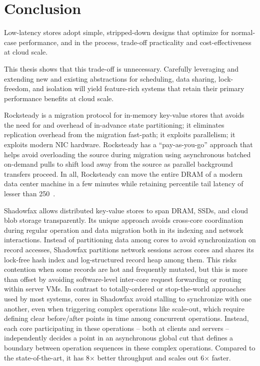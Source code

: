 \chapter{Conclusion}

Low-latency stores adopt simple, stripped-down designs that optimize
for normal-case performance, and in the process, trade-off
practicality and cost-effectiveness at cloud scale.

This thesis shows that this trade-off is unnecessary. Carefully
leveraging and extending new and existing abstractions for scheduling,
data sharing, lock-freedom, and isolation will yield feature-rich
systems that
retain their primary performance benefits at cloud scale.

Rocksteady is a migration protocol for in-memory key-value stores that avoids
the need for and overhead of in-advance state partitioning; it eliminates
replication overhead from the migration fast-path; it exploits parallelism;
it exploits modern NIC hardware.  Rocksteady has a
``pay-as-you-go'' approach that helps avoid overloading the source during migration
using asynchronous batched on-demand pulls to shift load away from the source
as parallel background transfers proceed.  In all, Rocksteady can move the entire DRAM
of a modern data center machine in a few minutes while retaining \nnnth
percentile tail latency of lesser than 250~\us.

Shadowfax allows distributed key-value stores to
span DRAM, SSDs, and cloud blob storage transparently.
%
Its unique approach avoids cross-core coordination during
regular operation and data migration both in its indexing and network
interactions.
%
Instead of partitioning data among cores to avoid synchronization on record
accesses, Shadowfax partitions network
sessions across cores and shares its lock-free hash index and log-structured
record heap among them.
%
This risks contention when some records are hot and frequently
mutated, but this is more than offset by avoiding software-level
inter-core request forwarding or routing within server VMs.
%
In contrast to totally-ordered or stop-the-world approaches used by most
systems, cores in Shadowfax avoid stalling to synchronize with one another, even when
triggering complex operations like scale-out, which require
defining clear before/after points in time among concurrent operations.
%
Instead, each core participating in these operations -- both at clients and
servers -- independently decides a point in an asynchronous global
cut that defines a boundary between operation sequences in these complex operations.
%
Compared to the state-of-the-art, it has 8$\times{}$ better throughput
and scales out 6$\times{}$ faster.

